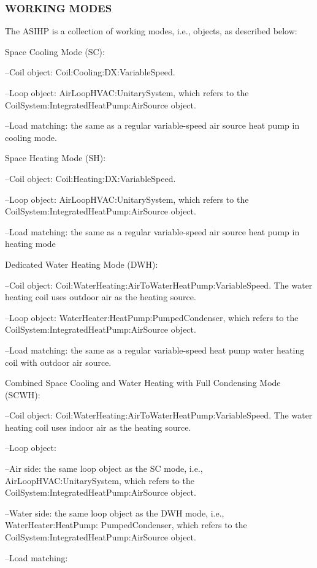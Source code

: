 \subsubsection{WORKING MODES}\label{WORKING-MODES-ASIHP}

The ASIHP is a collection of working modes, i.e., objects, as described below: 

Space Cooling Mode (SC):

--Coil object: Coil:Cooling:DX:VariableSpeed. 

--Loop object: AirLoopHVAC:UnitarySystem,  which refers to the CoilSystem:IntegratedHeatPump:AirSource object. 

--Load matching: the same as a regular variable-speed air source heat pump in cooling mode.

Space Heating Mode (SH):

--Coil object: Coil:Heating:DX:VariableSpeed.

--Loop object: AirLoopHVAC:UnitarySystem, which refers to the CoilSystem:IntegratedHeatPump:AirSource object. 

--Load matching: the same as a regular variable-speed air source heat pump in heating mode

Dedicated Water Heating Mode (DWH):

--Coil object: Coil:WaterHeating:AirToWaterHeatPump:VariableSpeed. The water heating coil uses outdoor air as the heating source. 

--Loop object: WaterHeater:HeatPump:PumpedCondenser, which refers to the CoilSystem:IntegratedHeatPump:AirSource object. 

--Load matching: the same as a regular variable-speed heat pump water heating coil with outdoor air source.

Combined Space Cooling and Water Heating with Full Condensing Mode (SCWH):

--Coil object: Coil:WaterHeating:AirToWaterHeatPump:VariableSpeed. The water heating coil uses indoor air as the heating source. 

--Loop object: 

--Air side: the same loop object as the SC mode, i.e., AirLoopHVAC:UnitarySystem, which refers to the CoilSystem:IntegratedHeatPump:AirSource object. 

--Water side: the same loop object as the DWH mode, i.e., WaterHeater:HeatPump: PumpedCondenser, which refers to the CoilSystem:IntegratedHeatPump:AirSource object. 

--Load matching: 

